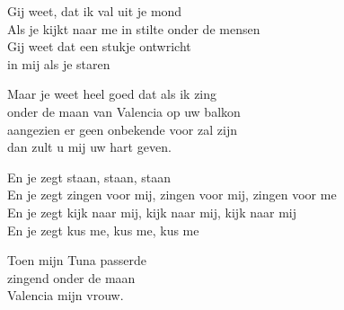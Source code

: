\clearpage
\begin{translation}
Gij weet, dat ik val uit je mond\\
Als je kijkt naar me in stilte onder de mensen\\
Gij weet dat een stukje ontwricht\\
in mij als je staren\vspace{\wlskip}

Maar je weet heel goed dat als ik zing\\
onder de maan van Valencia op uw balkon\\
aangezien er geen onbekende voor zal zijn\\
dan zult u mij uw hart geven.\vspace{\wlskip}

En je zegt staan, staan, staan\\
En je zegt zingen voor mij, zingen voor mij, zingen voor me\\
En je zegt kijk naar mij, kijk naar mij, kijk naar mij\\
En je zegt kus me, kus me, kus me\vspace{\wlskip}

Toen mijn Tuna passerde\\
zingend onder de maan\\
Valencia mijn vrouw.
\end{translation}
